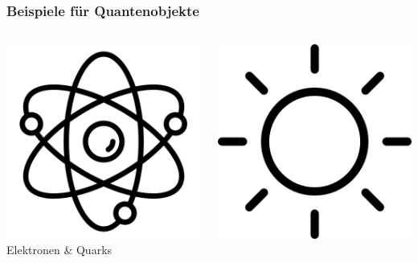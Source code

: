 \begin{frame}
	\frametitle{Beispiele für Quantenobjekte}
	\begin{columns}
		\begin{column}{0.33\linewidth}
			\centering
			\includegraphics[scale=0.15]{figures/Kommunikation/atom.png}\\
			Elektronen \& Quarks
		\end{column}
		\begin{column}{0.33\linewidth}
			\centering
			\includegraphics[scale=0.12]{figures/Kommunikation/sonne.png}\\

\end{column}
\end{columns}
\end{frame}
